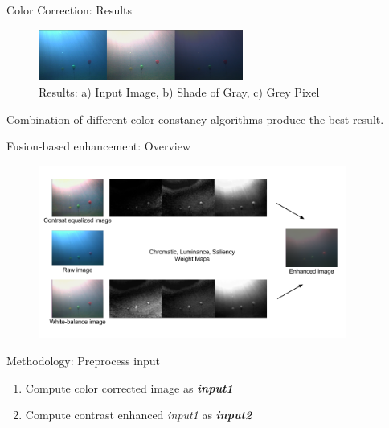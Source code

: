 \documentclass[13pt]{beamer}
\begin{document}
\begin{frame}{Color Correction: Results}

  \begin{figure}[ht]
      \centering
      \includegraphics[width=0.6\textwidth, height=0.2\textwidth]{figs/colorcorrection.png}
      \caption{Results: a) Input Image, b) Shade of Gray, c) Grey Pixel}
  \end{figure}

  Combination of different color constancy algorithms produce the best result.

\end{frame}

\begin{frame}{Fusion-based enhancement: Overview}

  \begin{figure}[ht]
      \centering
      \includegraphics[width=0.9\textwidth, height=0.6\textwidth]{figs/fusion_pipeline.png}
  \end{figure}

\end{frame}

\begin{frame}{Methodology: Preprocess input}
  \begin{enumerate}
    \item Compute color corrected image as \textbf{\textit{input1}}
    \item Compute contrast enhanced \textit{input1} as \textbf{\textit{input2}}
  \end{enumerate}
\end{frame}
\end{document}
